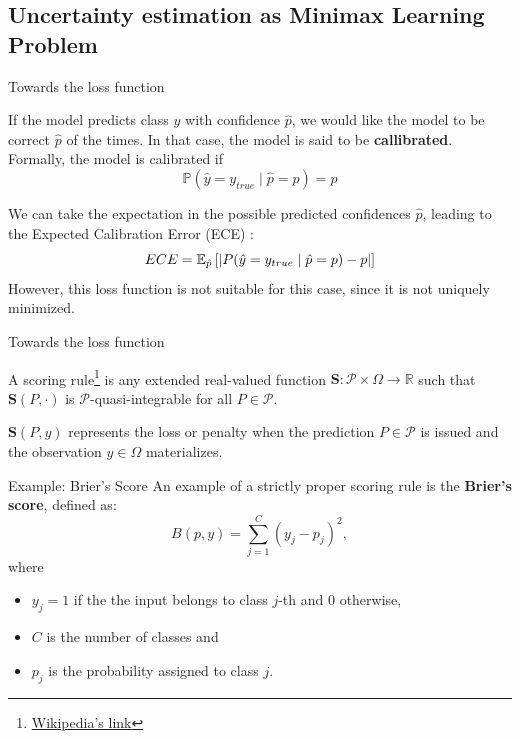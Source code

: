 \documentclass[xcolor=table]{beamer}
\DeclarePairedDelimiter\abs{\lvert}{\rvert}%
\begin{document}
\subsection{Uncertainty estimation as Minimax Learning Problem}

\begin{frame}{Towards the loss function}

If the model predicts class \(y\) with confidence \(\hat p\), we would like the model to be correct \(\hat p\) of the times. In that case, the model is said to be \textbf{callibrated}. Formally, the model is calibrated if
\[
\mathbb P(\hat y = y_{true} \mid \hat p = p ) = p
\]

We can take the expectation in the possible predicted confidences \(\hat p\), leading to the Expected Calibration Error (ECE) \citep{ECE2017}:
\[
ECE = \mathbb E_{\hat p}  \left[ \abs{ \mathbb \mathbb P(\hat y = y_{true} \mid \hat p = p ) - p}\right]
\]
However, this loss function is not suitable for this case, since it is not uniquely minimized.\\




\end{frame}

\begin{frame}{Towards the loss function}
    \begin{definition}
A scoring rule\footnote{\href{https://en.wikipedia.org/wiki/Scoring_rule}{Wikipedia's link}} is any extended real-valued function \({\displaystyle \mathbf {S} :{\mathcal {P}}\times \Omega \rightarrow \mathbb {R} }\) such that \( {\displaystyle \mathbf {S} (P,\cdot )}\) is \({\mathcal {P}}\)-quasi-integrable for all \( P\in {\mathcal {P}}\).
\end{definition}
 \( {\displaystyle \mathbf {S} (P,y)}\) represents the loss or penalty when the prediction  \(P\in {\mathcal {P}} \) is issued and the observation \(y\in \Omega\) materializes. 
\end{frame}


\begin{frame}{Example: Brier's Score}
    An example of a strictly proper scoring rule is the \textbf{Brier's score}, defined as:
    \[
    B(p,y) = \sum_{j=1}^C (y_j - p_j)^2  ,
    \]
    where 
    \begin{itemize}
        \item \(y_j = 1\) if the the input belongs to class \(j\)-th and \(0\) otherwise, 
        \item \(C\) is the number of classes and
        \item \(p_j\) is the probability assigned to class \(j\).
    \end{itemize}
    
\end{frame}
\end{document}

